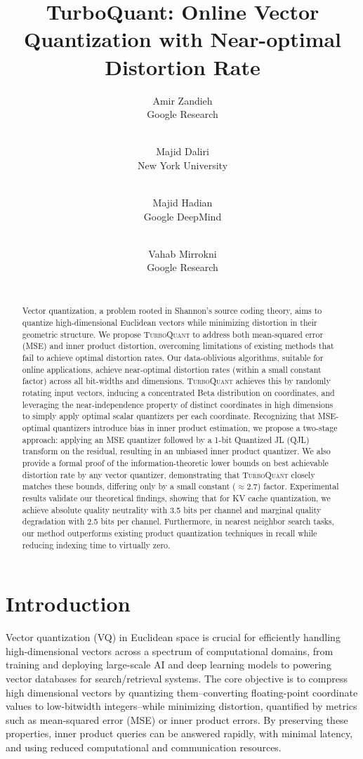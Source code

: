 \documentclass[11pt]{article}
\title{TurboQuant: Online Vector Quantization with Near-optimal Distortion Rate}
\author{
  Amir Zandieh\\
  Google Research\\
  \email{zandieh@google.com} \\
  \and
  Majid Daliri\\
  New York University\\
  \email{daliri.majid@nyu.edu} \\
  \and 
  Majid Hadian\\
  Google DeepMind\\
  \email{majidh@google.com} \\
  \and 
  Vahab Mirrokni \\
  Google Research\\
  \email{mirrokni@google.com} \\
}
\date{}
\newcommand{\TurboQuant}{\textsc{TurboQuant}\xspace}
\begin{document}
\maketitle

\begin{abstract}
Vector quantization, a problem rooted in Shannon's source coding theory, aims to quantize high-dimensional Euclidean vectors while minimizing distortion in their geometric structure. 
We propose \TurboQuant to address both mean-squared error (MSE) and inner product distortion, overcoming limitations of existing methods that fail to achieve optimal distortion rates. 
Our data-oblivious algorithms, suitable for online applications, achieve near-optimal distortion rates (within a small constant factor) across all bit-widths and dimensions. 
\TurboQuant achieves this by randomly rotating input vectors, inducing a concentrated Beta distribution on coordinates, and leveraging the near-independence property of distinct coordinates in high dimensions to simply apply optimal scalar quantizers per each coordinate. 
Recognizing that MSE-optimal quantizers introduce bias in inner product estimation, we propose a two-stage approach: applying an MSE quantizer followed by a 1-bit Quantized JL (QJL) transform on the residual, resulting in an unbiased inner product quantizer. 
We also provide a formal proof of the information-theoretic lower bounds on best achievable distortion rate by any vector quantizer, demonstrating that \TurboQuant closely matches these bounds, differing only by a small constant ($\approx 2.7$) factor.
Experimental results validate our theoretical findings, showing that for KV cache quantization, we achieve absolute quality neutrality with 3.5 bits per channel and marginal quality degradation with 2.5 bits per channel. 
Furthermore, in nearest neighbor search tasks, our method outperforms existing product quantization techniques in recall while reducing indexing time to  virtually zero.

\end{abstract}


\section{Introduction}
\label{intro}

Vector quantization (VQ) in Euclidean space is crucial for efficiently handling high-dimensional vectors across a spectrum of computational domains, from training and deploying large-scale AI and deep learning models to powering vector databases for search/retrieval systems. 
The core objective is to compress high dimensional vectors by quantizing them--converting floating-point coordinate values to low-bitwidth integers--while minimizing distortion, quantified by metrics such as mean-squared error (MSE) or inner product errors.
By preserving these properties, inner product queries can be answered rapidly, with minimal latency, and using reduced computational and communication resources.
\end{document}
